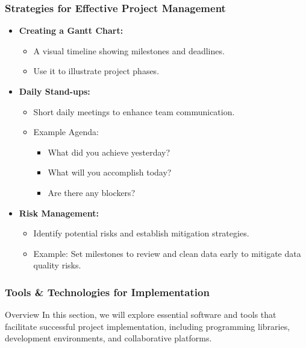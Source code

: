\documentclass[aspectratio=169]{beamer}
\begin{document}
\begin{frame}[fragile]
    \frametitle{Strategies for Effective Project Management}
    \begin{itemize}
        \item \textbf{Creating a Gantt Chart:} 
            \begin{itemize}
                \item A visual timeline showing milestones and deadlines.
                \item Use it to illustrate project phases.
            \end{itemize}

        \item \textbf{Daily Stand-ups:}
            \begin{itemize}
                \item Short daily meetings to enhance team communication.
                \item Example Agenda:
                    \begin{itemize}
                        \item What did you achieve yesterday?
                        \item What will you accomplish today?
                        \item Are there any blockers?
                    \end{itemize}
            \end{itemize}

        \item \textbf{Risk Management:}
            \begin{itemize}
                \item Identify potential risks and establish mitigation strategies.
                \item Example: Set milestones to review and clean data early to mitigate data quality risks.
            \end{itemize}
    \end{itemize}
\end{frame}

\begin{frame}
    \frametitle{Tools \& Technologies for Implementation}
    \begin{block}{Overview}
        In this section, we will explore essential software and tools that facilitate successful project implementation, including programming libraries, development environments, and collaborative platforms.
    \end{block}
\end{frame}
\end{document}
